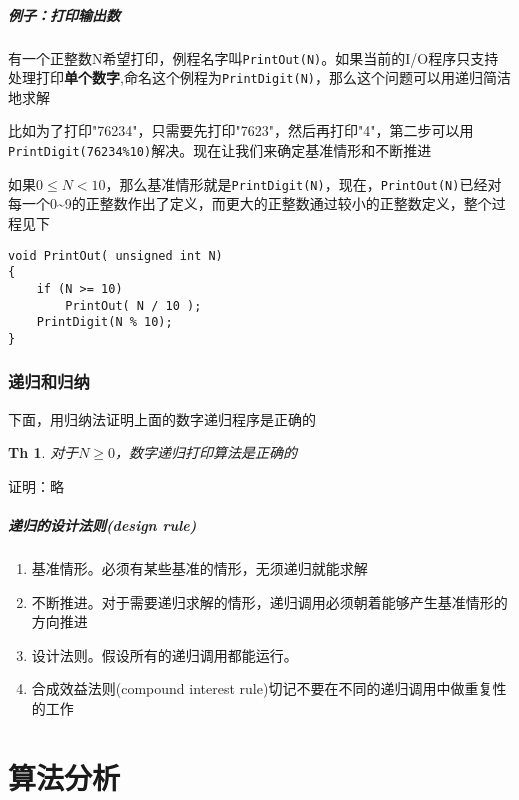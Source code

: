 \documentclass[utf8]{ctexbook}
\newtheorem{Theorem}{\large\textbf Th}[chapter]
\begin{document}
\paragraph{例子：打印输出数}
有一个正整数N希望打印，例程名字叫\verb|PrintOut(N)|。如果当前的I/O程序只支持处理打印\textbf{单个数字},命名这个例程为\verb|PrintDigit(N)|，那么这个问题可以用递归简洁地求解

比如为了打印"76234"，只需要先打印"7623"，然后再打印"4"，第二步可以用\verb|PrintDigit(76234%10)|解决。现在让我们来确定基准情形和不断推进

如果$0\le N < 10$，那么基准情形就是\verb|PrintDigit(N)|，现在，\verb|PrintOut(N)|已经对每一个0\~{}9的正整数作出了定义，而更大的正整数通过较小的正整数定义，整个过程见下

\begin{lstlisting}
void PrintOut( unsigned int N) 
{
    if (N >= 10)
        PrintOut( N / 10 );
    PrintDigit(N % 10);
}
\end{lstlisting}
\subsection{递归和归纳}
下面，用归纳法证明上面的数字递归程序是正确的

\begin{Theorem}
    对于$N\ge 0$，数字递归打印算法是正确的
\end{Theorem}
{\heiti 证明：}略

\paragraph{递归的设计法则(design rule)}
\begin{enumerate}
    \item {\kaishu 基准情形}。必须有某些基准的情形，无须递归就能求解
    \item {\kaishu 不断推进}。对于需要递归求解的情形，递归调用必须朝着能够产生基准情形的方向推进
    \item {\kaishu 设计法则}。假设所有的递归调用都能运行。
    \item {\kaishu 合成效益法则}(compound interest rule)切记不要在不同的递归调用中做重复性的工作
\end{enumerate}

\chapter{算法分析}
\end{document}
